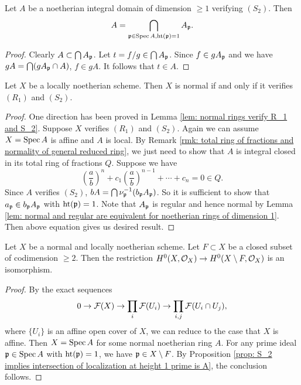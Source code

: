     \begin{proposition}\label{prop: S_2 implies intersection of localization at height 1 prime is A}
        Let $A$ be a noetherian integral domain of dimension $\geq 1$ verifying $(S_2)$.
        Then 
        \[ A = \bigcap_{{\mathfrak{p}} \in \operatorname{Spec} A, \operatorname{ht}({\mathfrak{p}}) = 1} A_{\mathfrak{p}}. \]
    \end{proposition}
    \begin{proof}
        Clearly $A \subset \bigcap A_{\mathfrak{p}}$.
        Let $t = f/g \in \bigcap A_{\mathfrak{p}}$.
        Since $f\in gA_{\mathfrak{p}}$ and we have $g A = \bigcap (gA_{\mathfrak{p}} \cap A)$, $f \in gA$.
        It follows that $t \in A$.
    \end{proof}

    \begin{theorem}
        Let $X$ be a locally noetherian scheme.
        Then $X$ is normal if and only if it verifies $(R_1)$ and $(S_2)$.
    \end{theorem}
    \begin{proof}
        One direction has been proved in Lemma \ref{lem: normal rings verify R_1 and S_2}.
        Suppose $X$ verifies $(R_1)$ and $(S_2)$.
        Again we can assume $X = \operatorname{Spec} A$ is affine and $A$ is local.
        By Remark \ref{rmk: total ring of fractions and normality of general reduced ring}, we just need to show that $A$ is integral closed in its total ring of fractions $Q$.
        Suppose we have 
        \[ \left(\frac{a}{b}\right)^n + c_1 \left(\frac{a}{b}\right)^{n-1} + \cdots + c_n = 0 \in Q. \]
        Since $A$ verifies $(S_2)$, $b A = \bigcap \nu_{\mathfrak{p}}^{-1}(b_{\mathfrak{p}} A_{\mathfrak{p}})$.
        So it is sufficient to show that $a_{{\mathfrak{p}}} \in b_{\mathfrak{p}} A_{\mathfrak{p}}$ with $\operatorname{ht}({\mathfrak{p}}) = 1$.
        Note that $A_{\mathfrak{p}}$ is regular and hence normal by Lemma \ref{lem: normal and regular are equivalent for noetherian rings of dimension 1}.
        Then above equation gives us desired result.
    \end{proof}

    \begin{theorem}\label{thm: extension of function on normal scheme}
        Let $X$ be a normal and locally noetherian scheme.
        Let $F \subset X$ be a closed subset of codimension $\geq 2$.
        Then the restriction $H^0(X,{\mathcal{O}}_X) \to H^0(X\setminus F, {\mathcal{O}}_{X})$ is an isomorphism.
    \end{theorem}
    \begin{proof}
        By the exact sequences 
        \[ 0 \to {\mathcal{F}}(X) \to \prod_i {\mathcal{F}}(U_i) \to \prod_{i,j} {\mathcal{F}}(U_i \cap U_j), \]
        where $\{U_i\}$ is an affine open cover of $X$, we can reduce to the case that $X$ is affine.
        Then $X = \operatorname{Spec} A$ for some normal noetherian ring $A$.
        For any prime ideal ${\mathfrak{p}} \in \operatorname{Spec} A$ with $\operatorname{ht}({\mathfrak{p}}) = 1$, we have ${\mathfrak{p}} \in X \setminus F$.
        By Proposition \ref{prop: S_2 implies intersection of localization at height 1 prime is A}, the conclusion follows.
    \end{proof}

